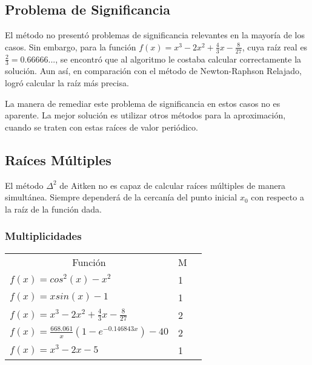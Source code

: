 \documentclass[a4paper,12pt]{article}
\begin{document}
\newpage

\subsection{Problema de Significancia}

El método no presentó problemas de significancia relevantes en la mayoría de los casos. Sin embargo, para la función $f(x)=x^3-2x^2+\frac{4}{3}x-\frac{8}{27}$, cuya raíz real es $\frac{2}{3}=0.66666...$, se encontró que al algoritmo le costaba calcular correctamente la solución. Aun así, en comparación con el método de Newton-Raphson Relajado, logró calcular la raíz más precisa. \par 

La manera de remediar este problema de significancia en estos casos no es aparente. La mejor solución es utilizar otros métodos para la aproximación, cuando se traten con estas raíces de valor periódico. \par

\subsection{Raíces Múltiples}

El método $\Delta^2$ de Aitken no es capaz de calcular raíces múltiples de manera simultánea.  Siempre dependerá de la cercanía del punto inicial $x_0$ con respecto a la raíz de la función dada.

\subsubsection{Multiplicidades}

\begin{table}[ht!]
\begin{tabular}{llr}
\multicolumn{1}{c}{Función}  & 
\multicolumn{1}{c}{M} 
\\
$f(x) = cos^2(x)-x^2$              & 1                        
\\
$f(x) = xsin(x)-1$                 & 1                 
\\
$f(x) = x^3-2x^2+\frac{4}{3}x-\frac{8}{27}$   & 2 
\\
$f(x) = \frac{668.061}{x} (1 - e^{-0.146843 x}) - 40$ & 2
\\
$f(x) = x^3-2x-5$             & 1                         
\end{tabular}
\end{table}

\vspace{-1em}
\end{document}
